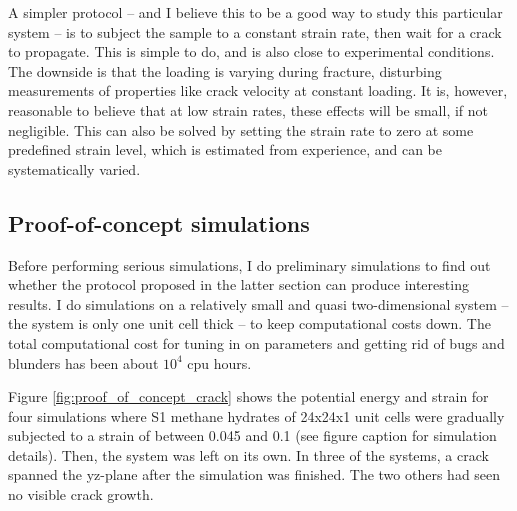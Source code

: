 A simpler protocol -- and I believe this to be a good way to study this particular system -- is to subject the sample to a constant strain rate, then wait for a crack to propagate. This is simple to do, and is also close to experimental conditions. The downside is that the loading is varying during fracture, disturbing measurements of properties like crack velocity at constant loading. It is, however, reasonable to believe that at low strain rates, these effects will be small, if not negligible. This can also be solved by setting the strain rate to zero at some predefined strain level, which is estimated from experience, and can be systematically varied. 


\subsection{Proof-of-concept simulations}
Before performing serious simulations, I do preliminary simulations to find out whether the protocol proposed in the latter section can produce interesting results. I do simulations on a relatively small and quasi two-dimensional system -- the system is only one unit cell thick -- to keep computational costs down. The total computational cost for tuning in on parameters and getting rid of bugs and blunders has been about $10^4$ cpu hours.

Figure \ref{fig:proof_of_concept_crack} shows the potential energy and strain for four simulations where S1 methane hydrates of 24x24x1 unit cells were gradually subjected to a strain of between 0.045 and 0.1 (see figure caption for simulation details). Then, the system was left on its own. In three of the systems, a crack spanned the yz-plane after the simulation was finished. The two others had seen no visible crack growth.

